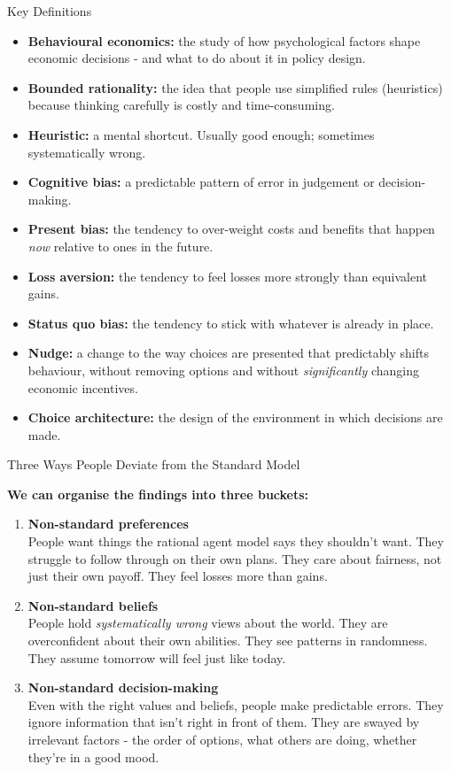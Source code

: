 \documentclass[10pt]{beamer}
\begin{document}
\begin{frame}[allowframebreaks]{Key Definitions}
\small
\begin{itemize}
\item \textbf{Behavioural economics:} the study of how psychological factors shape economic decisions - and what to do about it in policy design.
\item \textbf{Bounded rationality:} the idea that people use simplified rules (heuristics) because thinking carefully is costly and time-consuming.
\item \textbf{Heuristic:} a mental shortcut. Usually good enough; sometimes systematically wrong.
\item \textbf{Cognitive bias:} a predictable pattern of error in judgement or decision-making.
\item \textbf{Present bias:} the tendency to over-weight costs and benefits that happen \emph{now} relative to ones in the future.
\item \textbf{Loss aversion:} the tendency to feel losses more strongly than equivalent gains.
\item \textbf{Status quo bias:} the tendency to stick with whatever is already in place.
\item \textbf{Nudge:} a change to the way choices are presented that predictably shifts behaviour, without removing options and without \emph{significantly} changing economic incentives.
\item \textbf{Choice architecture:} the design of the environment in which decisions are made.
\end{itemize}
\end{frame}



\begin{frame}{Three Ways People Deviate from the Standard Model}

\textbf{We can organise the findings into three buckets:}


\begin{enumerate}
\item \textbf{Non-standard preferences} \\[3pt]
\footnotesize People want things the rational agent model says they shouldn't want.
They struggle to follow through on their own plans.
They care about fairness, not just their own payoff.
They feel losses more than gains.


\item \textbf{Non-standard beliefs} \\[3pt]
\footnotesize People hold \emph{systematically wrong} views about the world.
They are overconfident about their own abilities.
They see patterns in randomness.
They assume tomorrow will feel just like today.


\item \textbf{Non-standard decision-making} \\[3pt]
\footnotesize Even with the right values and beliefs, people make predictable errors.
They ignore information that isn't right in front of them.
They are swayed by irrelevant factors - the order of options, what others are doing, whether they're in a good mood.
\end{enumerate}
\end{frame}
\end{document}
